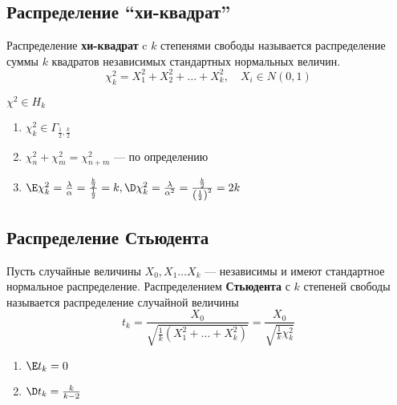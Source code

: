 \subsection{Распределение ``хи-квадрат''}

\begin{definition}
    Распределение \textbf{хи-квадрат} c \(k\) степенями свободы называется распределение суммы \(k\) квадратов независимых стандартных нормальных величин.
    \[\chi^2_k = X_1^2 + X_2^2 + \dots + X_k^2, \quad X_i \in N(0, 1)\]
\end{definition}
\begin{notation}
    \(\chi^2 \in H_k\)
\end{notation}

\begin{prop}\itemfix
    \begin{enumerate}
        \item \(\chi_k^2 \in \Gamma_{\frac{1}{2}, \frac{k}{2}}\)
        \item \(\chi_n^2 + \chi_m^2 = \chi_{n + m}^2\) --- по определению
        \item \(\E \chi_k^2 = \frac{\lambda}{\alpha} = \frac{\frac{k}{2}}{\frac{1}{2}} = k, \D \chi_k^2 = \frac{\lambda}{\alpha^2} = \frac{\frac{k}{2}}{\left(\frac{1}{2}\right)^2} = 2k\)
    \end{enumerate}
\end{prop}

\subsection{Распределение Стьюдента}

\begin{definition}
    Пусть случайные величины \(X_0, X_1 \dots X_k\) --- независимы и имеют стандартное нормальное распределение. Распределением \textbf{Стьюдента} с \(k\) степеней свободы называется распределение случайной величины
    \[t_k = \frac{X_0}{\sqrt{\frac{1}{k}(X_1^2 + \dots + X_k^2)}} = \frac{X_0}{\sqrt{\frac{1}{k} \chi_k^2}}\]
\end{definition}

\begin{prop}\itemfix
    \begin{enumerate}
        \item \(\E t_k = 0\)
        \item \(\D t_k = \frac{k}{k - 2}\)
    \end{enumerate}
\end{prop}

